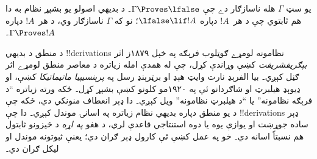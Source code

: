\documentclass[../../../include/open-logic-section]{subfiles}
\begin{document}
يو سټ $\Gamma$ هله ناسازګار دے چې $\Gamma \Proves \lfalse$۔ د
بديهي اصولو يو بشپړ نظام به دا هم ثابتوي چې د هر~$!A$ دپاره
$\lfalse \lif !A$؛ نو که $\Gamma$ ناسازګار وي، د هر~$!A$ دپاره
$\Gamma \Proves !A$۔

د منطق د بديهي !!{derivation}s نظامونه لومړے ګوټلوب فرېګه په خپل
۱۸۷۹ز اثر \emph{بېګريفشريفت} کښې وړاندې کړل، چې له همدې امله زياتره
د معاصر منطق لومړے اثر ګڼل کېږي۔ بيا الفرېډ نارت وايټ هېډ او برټرېنډ
رسل په \emph{پرېنسيپيا ماتيماتيکا} کښې، او ډيوېډ هيلبرټ او شاګردانو
ئې په ۱۹۲۰مو کلونو کښې بشپړ کړل۔ ځکه ورته زياتره ``د فرېګه نظامونه''
يا ``د هيلبرټ نظامونه'' ويل کېږي۔ دا ډېر انعطاف منونکي دي، ځکه چې د
يو منطق دپاره بديهي نظام زياتره په اسانۍ موندل کېږي۔ دا چې
!!{derivation}s ډېر ساده جوړښت او يوازې يوه يا دوه استنتاجي قاعدې
لري، د هغو \emph{په اړه} د څيزونو ثابتول هم نسبتاً اسانه دي۔ خو په
عمل کښې ئې کارول ډېر ګران دي؛ يعنې ثبوتونه موندل او ليکل ګران دي۔
\end{document}

